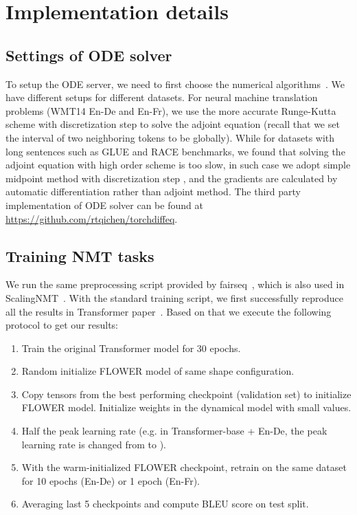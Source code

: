 \documentclass[11pt]{article}
\begin{document}
\section{Implementation details}
\subsection{Settings of ODE solver}
To setup the ODE server, we need to first choose the numerical algorithms~\cite{press1992numerical}. We have different setups for different datasets. For neural machine translation problems (WMT14 En-De and En-Fr), we use the more accurate Runge-Kutta scheme with discretization  step  to solve the adjoint equation (recall that we set the interval of two neighboring tokens to be  globally). While for datasets with long sentences such as GLUE and RACE benchmarks, we found that solving the adjoint equation with high order scheme is too slow, in such case we adopt simple midpoint method with discretization  step , and the gradients are calculated by automatic differentiation rather than adjoint method. The third party implementation of ODE solver can be found at \url{https://github.com/rtqichen/torchdiffeq}.
\subsection{Training NMT tasks}
We run the same preprocessing script provided by fairseq~\cite{ott2019fairseq}, which is also used in ScalingNMT~\cite{ott2018scaling}. With the standard training script, we first successfully reproduce all the results in Transformer paper~\cite{vaswani2017attention}. Based on that we execute the following protocol to get our results:
\begin{enumerate}
    \item Train the original Transformer model for 30 epochs.
    \item Random initialize FLOWER model of same shape configuration. 
    \item Copy tensors from the best performing checkpoint (validation set) to initialize FLOWER model. Initialize weights in the dynamical model with small values.
    \item Half the peak learning rate (e.g. in Transformer-base + En-De, the peak learning rate is changed from  to ).
    \item With the warm-initialized FLOWER checkpoint, retrain on the same dataset for 10 epochs (En-De) or 1 epoch (En-Fr). 
    \item Averaging last 5 checkpoints and compute BLEU score on test split.
\end{enumerate}
\end{document}
